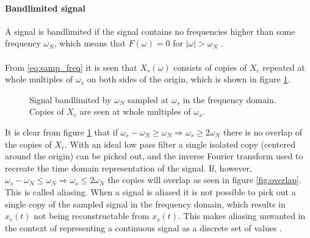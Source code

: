 \paragraph{Bandlimited signal}
A signal is bandlimited if the signal contains no frequencies higher than some frequency $\omega_N$, which means that $F(\omega) = 0$ for $|\omega|>\omega_N$ \cite{FAA}.
\\\\
From \eqref{eq:samp_freq} it is seen that $X_s(\omega)$ consists of copies of $X_c$ repeated at whole multiples of $\omega_s$ on both sides of the origin, which is shown in figure \ref{fig:copies}.
\begin{figure}[H]
\centering
{}
\caption{Signal bandlimited by $\omega_N$ sampled at $\omega_s$ in the frequency domain. Copies of $X_c$ are seen at whole multiples of $\omega_s$.}
\label{fig:copies}
\end{figure}

It is clear from figure \ref{fig:copies} that if $\omega_s-\omega_N\geq \omega_N\Rightarrow \omega_s\geq 2\omega_N$ there is no overlap of the copies of $X_c$. With an ideal low pass filter  a single isolated copy (centered around the origin) can be picked out, and the inverse Fourier transform used to recreate the time domain representation of the signal. If, however, $\omega_s-\omega_N\leq \omega_N\Rightarrow \omega_s\leq 2\omega_N$ the copies will overlap as seen in figure \ref{fig:overlap}. This is called aliasing. When a signal is aliased it is not possible to pick out a single copy of the sampled signal in the frequency domain, which results in $x_c(t)$ not being reconstructable from $x_s(t)$. This makes aliasing unwanted in the context of representing a continuous signal as a discrete set of values .

